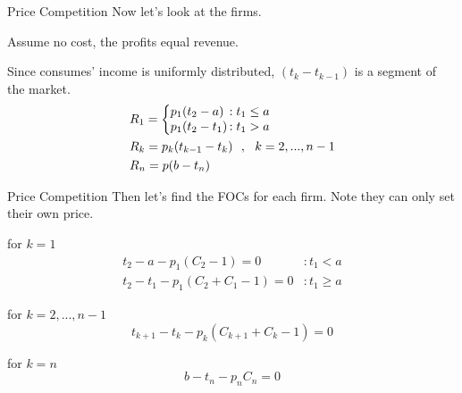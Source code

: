 \documentclass[10pt]{beamer}
\begin{document}
\begin{frame}{Price Competition}
Now let's look at the firms. 

Assume no cost, the profits equal revenue. 

Since consumes' income is uniformly distributed, $(t_k - t_{k-1})$ is a segment of the market.
\begin{equation}
\begin{split}
& R_1 = \left\{ 
\begin{array}{@{}l@{\thinspace}l}
p_1(t_2 - a) &:  t_1 \leq a\\
p_1(t_2 - t_1) &:  t_1 > a\\
\end{array}
\right.\\
& R_k = p_k(t_{k-1} - t_k) \ \ , \ \ k = 2,..., n-1\\
& R_n = p(b - t_n) \\
\end{split}
\end{equation}
\end{frame}

\begin{frame}{Price Competition}
Then let's find the FOCs for each firm. Note they can only set their own price.

for $k = 1$
\begin{equation}
    \begin{split}
        t_2 - a - p_1(C_2 - 1 ) = 0  & : t_1 < a \\
        t_2 - t_1 -p_1(C_2 + C_1 -1) = 0 &: t_1 \geq a
    \end{split}
\end{equation}


for $k = 2,..., n-1$
\begin{equation}
    t_{k+1}-t_k - p_k(C_{k+1} + C_k - 1) = 0
\end{equation}

for $k = n$
\begin{equation}
    b - t_n - p_n C_n = 0
\end{equation}
\end{frame}
\end{document}
